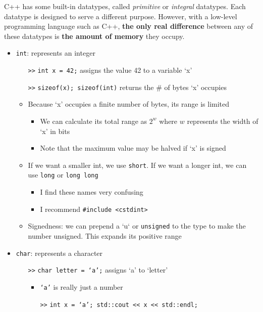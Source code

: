 \documentclass{article}
\begin{document}
\vspace{1em}	
\noindent
C++ has some built-in datatypes, called \textit{primitive} or \textit{integral} datatypes. Each datatype is designed to serve a different purpose. However, with a low-level programming language such as C++, \textbf{the only real difference} between any of these datatypes is \textbf{the amount of memory} they occupy.

\begin{itemize}
	\item \texttt{int}: represents an integer
		\begin{itemize}
			\item[\texttt{>>}] \texttt{int x = 42;} assigns the value 42 to a variable `x'
			\item[\texttt{>>}] \texttt{sizeof(x); sizeof(int)} returns the \# of bytes `x' occupies
			\item Because `x' occupies a finite number of bytes, its range is limited
			\begin{itemize}
				\item We can calculate its total range as $2^w$ where $w$ represents the width of `x' in bits
				\item Note that the maximum value may be halved if `x' is signed
			\end{itemize}
			\item If we want a smaller int, we use \texttt{short}. If we want a longer int, we can use \texttt{long} or \texttt{long long}
			\begin{itemize}
				\item I find these names very confusing
				\item I recommend \texttt{\#include <cstdint>}
			\end{itemize}
			\item Signedness: we can prepend a `u` or \texttt{unsigned} to the type to make the number unsigned. This expands its positive range
		\end{itemize}
		\item \texttt{char}: represents a character
		\begin{itemize}
			\item[\texttt{>>}] \texttt{char letter = `a';} assigns `a' to `letter'
				\begin{itemize}
					\item \texttt{`a'} is really just a number
					\item[\texttt{>>}] \texttt{int x = `a'; std::cout << x << std::endl;}
				\end{itemize}

\end{itemize}
\end{itemize}
\end{document}
